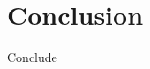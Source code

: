 \documentclass[letterpaper,12pt]{article}
\begin{document}
\chapter{Conclusion}
Conclude
\end{document}
